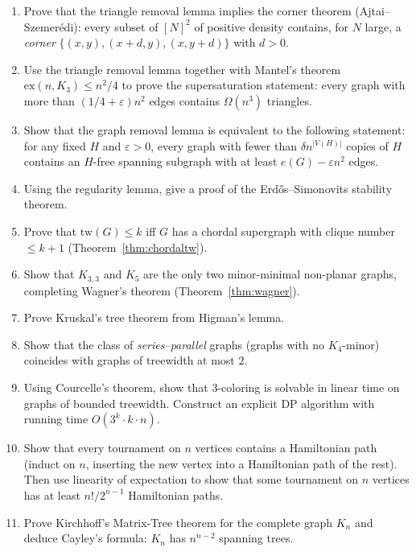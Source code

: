 \documentclass{article}
\theoremstyle{definition}
\begin{document}
\begin{enumerate}[resume]
\item Prove that the triangle removal lemma implies the corner theorem
(Ajtai--Szemer\'edi): every subset of $[N]^2$ of positive density
contains, for $N$ large, a \emph{corner} $\{(x, y), (x + d, y), (x, y + d)\}$ with $d > 0$.

\item Use the triangle removal lemma together with Mantel's theorem
$\mathrm{ex}(n, K_3) \le n^2/4$ to prove the supersaturation statement: every
graph with more than $(1/4 + \varepsilon) n^2$ edges contains $\Omega(n^3)$
triangles.

\item Show that the graph removal lemma is equivalent to the following
statement: for any fixed $H$ and $\varepsilon > 0$, every graph with
fewer than $\delta n^{|V(H)|}$ copies of $H$ contains an
$H$-free spanning subgraph with at least $e(G) - \varepsilon n^2$ edges.

\item Using the regularity lemma, give a proof of the Erd\H{o}s--Simonovits
stability theorem.

\item Prove that $\mathrm{tw}(G) \le k$ iff $G$ has a chordal supergraph
with clique number $\le k + 1$ (Theorem~\ref{thm:chordaltw}).

\item Show that $K_{3, 3}$ and $K_5$ are the only two minor-minimal
non-planar graphs, completing Wagner's theorem
(Theorem~\ref{thm:wagner}).

\item Prove Kruskal's tree theorem from Higman's lemma.

\item Show that the class of \emph{series--parallel} graphs (graphs with no
$K_4$-minor) coincides with graphs of treewidth at most $2$.

\item Using Courcelle's theorem, show that $3$-coloring is solvable in
linear time on graphs of bounded treewidth. Construct an explicit DP
algorithm with running time $O(3^k \cdot k \cdot n)$.

\item Show that every tournament on $n$ vertices contains a Hamiltonian path
(induct on $n$, inserting the new vertex into a Hamiltonian path of the
rest). Then use linearity of expectation to show that some tournament on
$n$ vertices has at least $n!/2^{n-1}$ Hamiltonian paths.

\item Prove Kirchhoff's Matrix-Tree theorem for the complete graph $K_n$
and deduce Cayley's formula: $K_n$ has $n^{n-2}$ spanning trees.
\end{enumerate}
\end{document}
